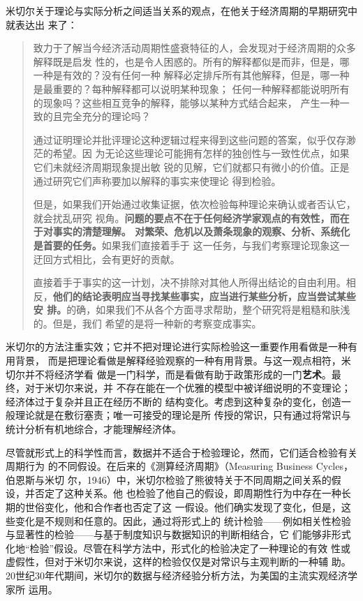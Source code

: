 米切尔关于理论与实际分析之间适当关系的观点，在他关于经济周期的早期研究中就表达出
来了：
\begin{quotation}
  致力于了解当今经济活动周期性盛衰特征的人，会发现对于经济周期的众多解释既是启发
  性的，也是令人困惑的。所有的解释都似是而非，但是，哪一种是有效的？没有任何一种
  解释必定排斥所有其他解释，但是，哪一种是最重要的？每种解释都可以说明某种现象；
  任何一种解释都能说明所有的现象吗？这些相互竞争的解释，能够以某种方式结合起来，
  产生一种一致的且完全充分的理论吗？

  通过证明理论并批评理论这种逻辑过程来得到这些问题的答案，似乎仅存渺茫的希望。因
  为无论这些理论可能拥有怎样的独创性与一致性优点，如果它们未就经济周期现象提出敏
  锐的见解，它们就都只有微小的价值。正是通过研究它们声称要加以解释的事实来使理论
  得到检验。

  但是，如果我们开始通过收集证据，依次检验每种理论来确认或者否认它，就会扰乱研究
  视角。\textbf{问题的要点不在于任何经济学家观点的有效性，而在于对事实的清楚理解。
    对繁荣、危机以及萧条现象的观察、分析、系统化是首要的任务。}如果我们直接着手于
  这一任务，与我们考察理论现象这一迂回方式相比，会有更好的贡献。

  直接着手于事实的这一计划，决不排除对其他人所得出结论的自由利用。相
  反，\textbf{他们的结论表明应当寻找某些事实，应当进行某些分析，应当尝试某些安
    排。}的确，如果我们不从各个方面寻求帮助，整个研究将是粗糙和肤浅的。但是，我们
  希望的是将一种新的考察变成事实。
\end{quotation}

米切尔的方法注重实效；它并不把对理论进行实际检验这一重要作用看做是一种有用背景，
而是把理论看做是解释经验观察的一种有用背景。与这一观点相符，米切尔并不将经济学看
做是一门科学，而是看做有助于政策形成的一门\textbf{艺术}。最终，对于米切尔来说，并
不存在能在一个优雅的模型中被详细说明的不变理论；经济体过于复杂并且正在经历不断的
结构变化。考虑到这种复杂的变化，创造一般理论就是在敷衍塞责；唯一可接受的理论是所
传授的常识，只有通过将常识与统计分析有机地综合，才能理解经济体。

尽管就形式上的科学性而言，数据并不适合于检验理论，然而，它们适合检验有关周期行为
的不同假设。在后来的《测算经济周期》（Measuring Business Cycles，伯恩斯与米切
尔，1946）中，米切尔检验了熊彼特关于不同周期之间关系的假设，并否定了这种关系。他
也检验了他自己的假设，即周期性行为中存在一种长期的世俗变化，他和合作者也否定了这
一假设。他们确实发现了变化，但是，这些变化是不规则和任意的。因此，通过将形式上的
统计检验——例如相关性检验与显著性的检验——与基于制度知识与数据知识的判断相结合，它
们能够非形式化地“检验”假设。尽管在科学方法中，形式化的检验决定了一种理论的有效
性或虚假性，但对于米切尔来说，这样的检验仅仅是对常识与主观判断的一种辅
助。20世纪30年代期间，米切尔的数据与经济经验分析方法，为美国的主流实观经济学家所
运用。

